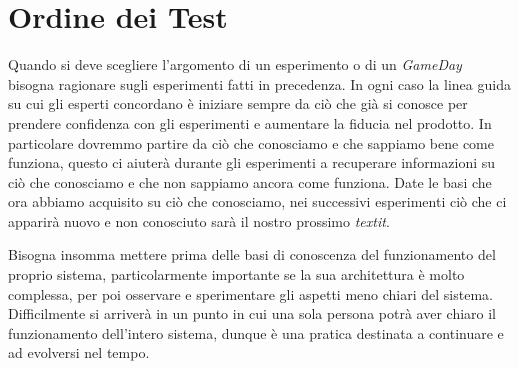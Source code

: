 \section{Ordine dei Test}
Quando si deve scegliere l'argomento di un esperimento o di un \textit{GameDay} bisogna ragionare sugli esperimenti fatti in precedenza.
In ogni caso la linea guida su cui gli esperti concordano è iniziare sempre da ciò che già si conosce per prendere confidenza con gli esperimenti e aumentare la fiducia nel prodotto.
In particolare dovremmo partire da ciò che conosciamo e che sappiamo bene come funziona, questo ci aiuterà durante gli esperimenti a recuperare informazioni su ciò che conosciamo e che non sappiamo ancora come funziona.
Date le basi che ora abbiamo acquisito su ciò che conosciamo, nei successivi esperimenti ciò che ci apparirà nuovo e non conosciuto sarà il nostro prossimo \textit{textit}.

Bisogna insomma mettere prima delle basi di conoscenza del funzionamento del proprio sistema, particolarmente importante se la sua architettura è molto complessa, per poi osservare e sperimentare gli aspetti meno chiari del sistema.
Difficilmente si arriverà in un punto in cui una sola persona potrà aver chiaro il funzionamento dell'intero sistema, dunque è una pratica destinata a continuare e ad evolversi nel tempo.